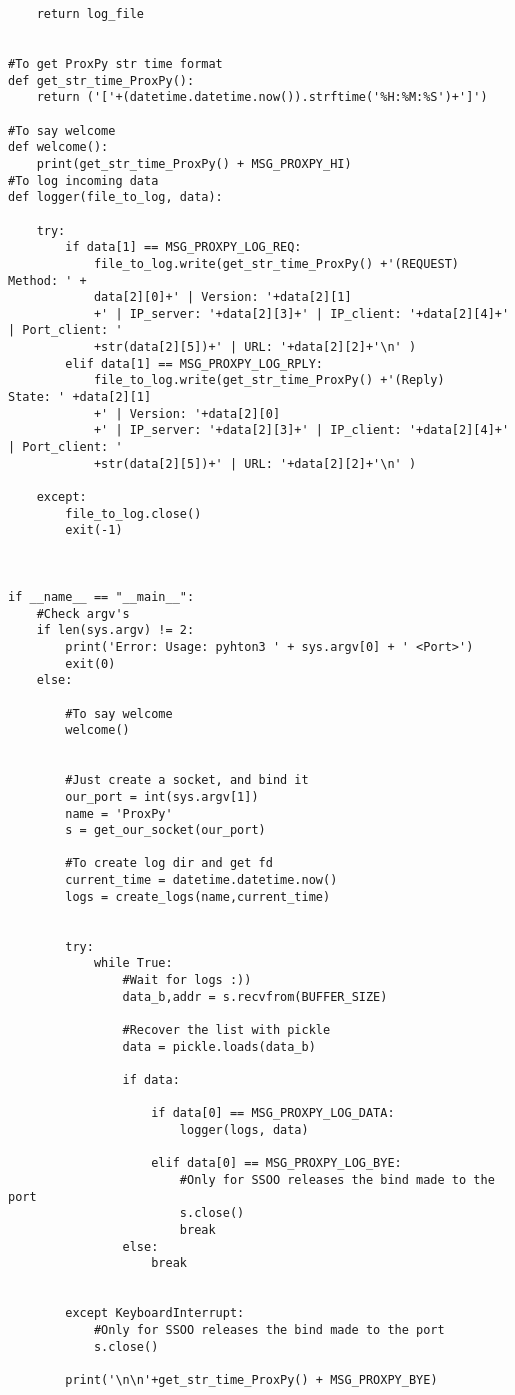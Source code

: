 \begin{verbatim}
    return log_file


#To get ProxPy str time format
def get_str_time_ProxPy():
    return ('['+(datetime.datetime.now()).strftime('%H:%M:%S')+']')

#To say welcome
def welcome():
    print(get_str_time_ProxPy() + MSG_PROXPY_HI)
#To log incoming data
def logger(file_to_log, data):
    
    try:
        if data[1] == MSG_PROXPY_LOG_REQ:
            file_to_log.write(get_str_time_ProxPy() +'(REQUEST) Method: ' +
            data[2][0]+' | Version: '+data[2][1]
            +' | IP_server: '+data[2][3]+' | IP_client: '+data[2][4]+' | Port_client: '
            +str(data[2][5])+' | URL: '+data[2][2]+'\n' )
        elif data[1] == MSG_PROXPY_LOG_RPLY:
            file_to_log.write(get_str_time_ProxPy() +'(Reply)    State: ' +data[2][1]
            +' | Version: '+data[2][0]
            +' | IP_server: '+data[2][3]+' | IP_client: '+data[2][4]+' | Port_client: '
            +str(data[2][5])+' | URL: '+data[2][2]+'\n' )
        
    except:
        file_to_log.close()
        exit(-1)



if __name__ == "__main__":
    #Check argv's
    if len(sys.argv) != 2:
        print('Error: Usage: pyhton3 ' + sys.argv[0] + ' <Port>')
        exit(0)
    else:

        #To say welcome 
        welcome()


        #Just create a socket, and bind it
        our_port = int(sys.argv[1])
        name = 'ProxPy'        
        s = get_our_socket(our_port)

        #To create log dir and get fd 
        current_time = datetime.datetime.now()
        logs = create_logs(name,current_time)


        try:          
            while True:
                #Wait for logs :))
                data_b,addr = s.recvfrom(BUFFER_SIZE)

                #Recover the list with pickle
                data = pickle.loads(data_b)

                if data:

                    if data[0] == MSG_PROXPY_LOG_DATA:
                        logger(logs, data)

                    elif data[0] == MSG_PROXPY_LOG_BYE:
                        #Only for SSOO releases the bind made to the port
                        s.close()
                        break
                else:
                    break
                

        except KeyboardInterrupt:
            #Only for SSOO releases the bind made to the port
            s.close()

        print('\n\n'+get_str_time_ProxPy() + MSG_PROXPY_BYE)

\end{verbatim}